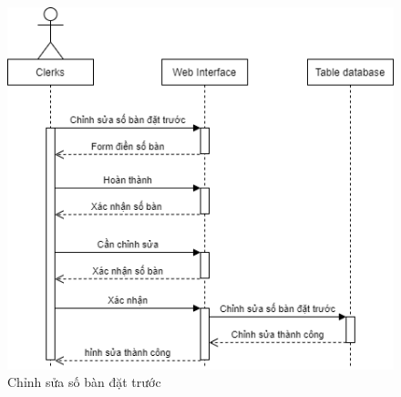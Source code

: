 \begin{figure}[!h]
    \begin{center}
        \includegraphics[scale=0.5]{Images/SequenceDiagram/SD_table.png}
    \end{center}
    \hspace{0.3cm}
    \caption{Chỉnh sửa số bàn đặt trước}
\end{figure}